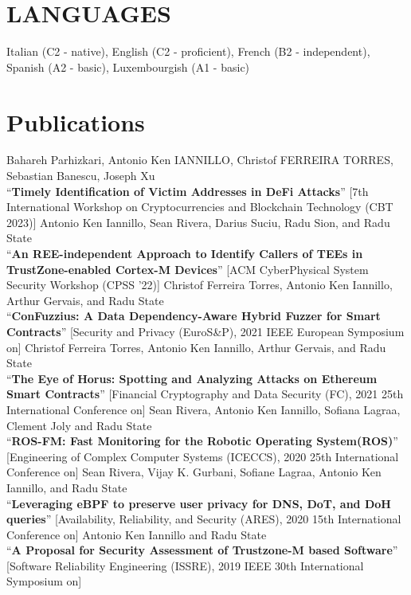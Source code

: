 \documentclass[margin,line]{resume}
\begin{document}
\begin{resume}
\filbreak
\section{\mysidestyle LANGUAGES} 
Italian (C2 - native), English (C2 - proficient), French (B2 - independent), Spanish (A2 - basic), Luxembourgish (A1 - basic)

\filbreak
\section{\mysidestyle Publications}

\filbreak
Bahareh Parhizkari, Antonio Ken IANNILLO, Christof FERREIRA TORRES, Sebastian Banescu, Joseph Xu\\
``\textbf{Timely Identification of Victim Addresses in DeFi Attacks}''
[7th International Workshop on Cryptocurrencies and Blockchain Technology (CBT 2023)]
\filbreak
Antonio Ken Iannillo, Sean Rivera, Darius Suciu, Radu Sion, and Radu State\\
``\textbf{An REE-independent Approach to Identify Callers of TEEs in TrustZone-enabled Cortex-M Devices}''
[ACM CyberPhysical System Security Workshop (CPSS ’22)]
\filbreak
Christof Ferreira Torres, Antonio Ken Iannillo, Arthur Gervais, and Radu State\\
``\textbf{ConFuzzius: A Data Dependency-Aware Hybrid Fuzzer for Smart Contracts}''
[Security and Privacy (EuroS\&P), 2021 IEEE European Symposium on]
\filbreak
Christof Ferreira Torres, Antonio Ken Iannillo, Arthur Gervais, and Radu State\\
``\textbf{The Eye of Horus: Spotting and Analyzing Attacks on Ethereum Smart Contracts}''
[Financial Cryptography and Data Security (FC), 2021 25th International Conference on]
\filbreak
Sean Rivera, Antonio Ken Iannillo, Sofiana Lagraa, Clement Joly and Radu State\\
``\textbf{ROS-FM: Fast Monitoring for the Robotic Operating System(ROS)}''
[Engineering of Complex Computer Systems (ICECCS), 2020 25th International Conference on]
\filbreak
Sean Rivera, Vijay K. Gurbani, Sofiane Lagraa, Antonio Ken Iannillo, and Radu State\\
``\textbf{Leveraging eBPF to preserve user privacy for DNS, DoT, and DoH queries}''
[Availability, Reliability, and Security (ARES), 2020 15th International Conference on]
\filbreak
Antonio Ken Iannillo and Radu State\\
``\textbf{A Proposal for Security Assessment of Trustzone-M based Software}''
[Software Reliability Engineering (ISSRE), 2019 IEEE 30th International Symposium on]

\end{resume}
\end{document}

